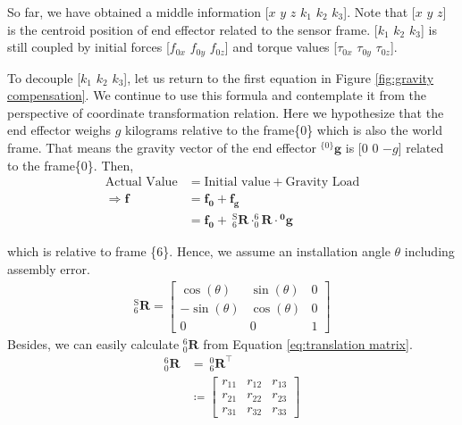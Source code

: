\par
So far, we have obtained a middle information [$x$ $y$ $z$ $k_1$ $k_2$ $k_3$]. Note that [$x$ $y$ $z$] is the centroid position of end effector related to the sensor frame. [$k_1$ $k_2$ $k_3$] is still coupled by initial forces [$f_{0x}$ $f_{0y}$ $f_{0z}$] and torque values [$\tau_{0x}$ $\tau_{0y}$ $\tau_{0z}$].
\par
To decouple [$k_1$ $k_2$ $k_3$], let us return to the first equation in Figure \ref{fig:gravity compensation}. We continue to use this formula and contemplate it from the perspective of coordinate transformation relation. Here we hypothesize that the end effector weighs $g$ kilograms relative to the frame\{0\} which is also the world frame. That means the gravity vector of the end effector $^{\{0\}}\boldsymbol{g}$ is [$0$ $0$ $-g$] related to the frame\{0\}. Then,
\begin{equation}
\label{eq:ffrrg}
\begin{split}
\text{Actual Value} &= \text{Initial value}	+ \text{Gravity Load}\\
\Rightarrow
\boldsymbol{f}		&= \boldsymbol{f_0} +\boldsymbol{f_g}\\
					&= \boldsymbol{f_0} +\ ^\mathrm{S}_6\mathbf{R} \cdot ^6_0\!\mathbf{R} \cdot \boldsymbol{^0\!g}
\end{split}
\end{equation}
\par\noindent
which is relative to frame \{6\}.
Hence, we assume an installation angle $\theta$ including assembly error.
\begin{equation}
\begin{split}
 ^\mathrm{S}_6\mathbf{R}
=
\begin{bmatrix}
\cos(\theta)	&\sin(\theta)	&0 \\
-\sin(\theta)	&\cos(\theta)	&0 \\
0				&0				&1
\end{bmatrix}
\end{split}
\end{equation}
Besides, we can easily calculate $^6_0\mathbf{R}$ from Equation \ref{eq:translation matrix}.
\begin{equation}
\begin{split}
^6_0\mathbf{R} 	&=\ ^0_6\mathbf{R}^\top\\
				&\coloneqq
\begin{bmatrix}
r_{11}		&r_{12}		&r_{13} \\
r_{21}		&r_{22}		&r_{23} \\
r_{31}		&r_{32}		&r_{33}
\end{bmatrix}
\end{split}
\end{equation}
